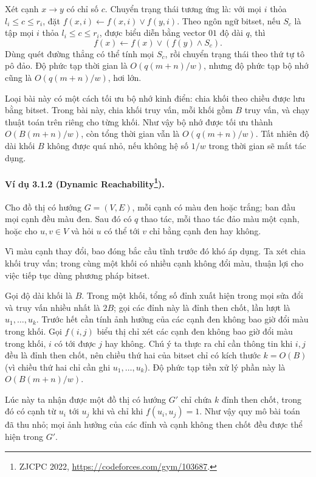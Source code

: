 \documentclass[11pt]{article}
\begin{document}
Xét cạnh $x\to y$ có chỉ số $c$. Chuyển trạng thái tương ứng là: với mọi
$i$ thỏa $l_i\le c\le r_i$, đặt
$f(x,i)\leftarrow f(x,i)\lor f(y,i)$. Theo ngôn ngữ bitset, nếu $S_c$ là tập
mọi $i$ thỏa $l_i\le c\le r_i$, được biểu diễn bằng vector $01$ độ dài $q$, thì
\[
f(x)\leftarrow f(x)\lor (f(y)\land S_c).
\]
Dùng quét đường thẳng có thể tính mọi $S_c$, rồi chuyển trạng thái theo thứ tự
tô pô đảo. Độ phức tạp thời gian là $O(q(m+n)/w)$, nhưng độ phức tạp bộ nhớ cũng
là $O(q(m+n)/w)$, hơi lớn.

Loại bài này có một cách tối ưu bộ nhớ kinh điển: chia khối theo chiều được lưu
bằng bitset. Trong bài này, chia khối truy vấn, mỗi khối gồm $B$ truy vấn, và
chạy thuật toán trên riêng cho từng khối. Như vậy bộ nhớ được tối ưu thành
$O(B(m+n)/w)$, còn tổng thời gian vẫn là $O(q(m+n)/w)$. Tất nhiên độ dài khối
$B$ không được quá nhỏ, nếu không hệ số $1/w$ trong thời gian sẽ mất tác dụng.

\paragraph{Ví dụ 3.1.2 (Dynamic Reachability\protect\footnote{ZJCPC 2022, \url{https://codeforces.com/gym/103687}.}).}
Cho đồ thị có hướng $G=(V,E)$, mỗi cạnh có màu đen hoặc trắng; ban đầu mọi cạnh
đều màu đen. Sau đó có $q$ thao tác, mỗi thao tác đảo màu một cạnh, hoặc cho
$u,v\in V$ và hỏi $u$ có thể tới $v$ chỉ bằng cạnh đen hay không.

Vì màu cạnh thay đổi, bao đóng bắc cầu tĩnh trước đó khó áp dụng. Ta xét chia
khối truy vấn; trong cùng một khối có nhiều cạnh không đổi màu, thuận lợi cho
việc tiếp tục dùng phương pháp bitset.

Gọi độ dài khối là $B$. Trong một khối, tổng số đỉnh xuất hiện trong mọi sửa đổi
và truy vấn nhiều nhất là $2B$; gọi các đỉnh này là đỉnh then chốt, lần lượt là
$u_1,\ldots,u_k$. Trước hết cần tính ảnh hưởng của các cạnh đen không bao giờ
đổi màu trong khối. Gọi $f(i,j)$ biểu thị chỉ xét các cạnh đen không bao giờ đổi
màu trong khối, $i$ có tới được $j$ hay không. Chú ý ta thực ra chỉ cần thông
tin khi $i,j$ đều là đỉnh then chốt, nên chiều thứ hai của bitset chỉ có kích
thước $k=O(B)$ (vì chiều thứ hai chỉ cần ghi $u_1,\ldots,u_k$). Độ phức tạp tiền
xử lý phần này là $O(B(m+n)/w)$.

Lúc này ta nhận được một đồ thị có hướng $G'$ chỉ chứa $k$ đỉnh then chốt, trong
đó có cạnh từ $u_i$ tới $u_j$ khi và chỉ khi $f(u_i,u_j)=1$. Như vậy quy mô bài
toán đã thu nhỏ; mọi ảnh hưởng của các đỉnh và cạnh không then chốt đều được thể
hiện trong $G'$.
\end{document}
